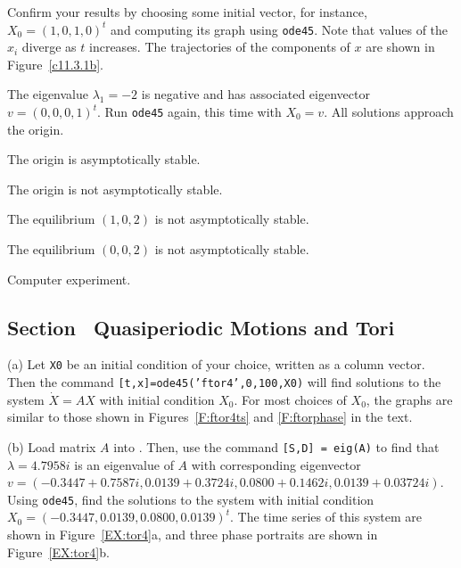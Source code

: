 \para Confirm your results by choosing some initial vector, for instance,
$X_0 = (1,0,1,0)^t$ and computing its graph using {\tt ode45}.  Note that
values of the $x_i$ diverge as $t$ increases.
The trajectories of the components of $x$ are shown in Figure~\ref{c11.3.1b}. 

\para The eigenvalue $\lambda_1 = -2$ is negative and has
associated eigenvector $v = (0,0,0,1)^t$.  Run {\tt ode45} again, this
time with $X_0 = v$.  All solutions approach the origin.

\begin{figure}[htb]
                       \centerline{%
                       }
\end{figure}

  The origin is asymptotically stable. 

\newpage
{}  The origin is not asymptotically stable. 

  The equilibrium $(1,0,2)$ is not asymptotically stable. 

  The equilibrium $(0,0,2)$ is not asymptotically stable. 


  Computer experiment.



\subsection*{Section~\protect{\ref{S:NLD}} Quasiperiodic Motions and Tori}

(a) Let {\tt X0} be an initial condition of your choice, written as a
column vector.  Then the command {\tt [t,x]=ode45('ftor4',0,100,X0)}
will find solutions to the system $\dot{X} = AX$ with initial condition
$X_0$.  For most choices of $X_0$, the graphs are similar to those shown
in Figures~\ref{F:ftor4ts} and \ref{F:ftorphase} in the text.

(b) Load matrix $A$ into \Matlabp.  Then, use the command
{\tt [S,D] = eig(A)} to find that $\lambda = 4.7958i$ is an eigenvalue of
$A$ with corresponding eigenvector $v = (-0.3447 + 0.7587i, 0.0139 +
0.3724i, 0.0800 + 0.1462i, 0.0139 + 0.03724i)$.  Using {\tt ode45}, find
the solutions to the system with initial condition $X_0 = (-0.3447, 0.0139,
0.0800, 0.0139)^t$.  The time series of this system are shown in
Figure~\ref{EX:tor4}a, and three phase portraits are shown in
Figure~\ref{EX:tor4}b.

